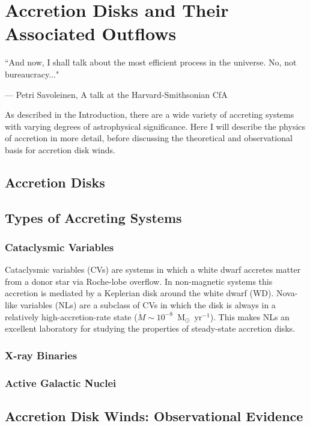 \chapter{Accretion Disks and Their Associated Outflows}

\epigraph{``And now, I shall talk about the most efficient process in the universe. No, not bureaucracy..."}
{--- \textup{Petri Savoleinen}, A talk at the Harvard-Smithsonian CfA}

As described in the Introduction, there are a wide variety of accreting systems
with varying degrees of astrophysical significance. Here I will describe the 
physics of accretion in more detail, before discussing the theoretical and observational 
basis for accretion disk winds. 

\section{Accretion Disks}


\section{Types of Accreting Systems}

\subsection{Cataclysmic Variables}

Cataclysmic variables (CVs) are systems in which a white dwarf
accretes matter from a donor star via Roche-lobe overflow. In
non-magnetic systems this accretion is mediated by a Keplerian disk
around the white dwarf (WD). Nova-like variables (NLs) are a subclass
of CVs in which the  disk is always in a relatively
high-accretion-rate state ($\dot{M} \sim 10^{-8}$~M$_{\odot}$~yr$^{-1}$).  
This makes NLs an excellent laboratory for studying the properties of 
steady-state accretion
disks.

\subsection{X-ray Binaries}


\subsection{Active Galactic Nuclei}




\section{Accretion Disk Winds: Observational Evidence}


